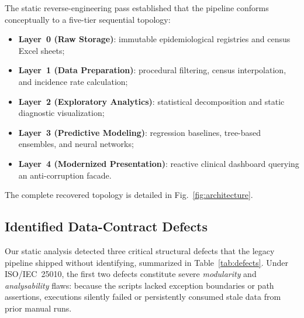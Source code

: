 \documentclass[conference]{IEEEtran}
\begin{document}
The static reverse-engineering pass established that the pipeline conforms conceptually to a five-tier sequential topology:
\begin{itemize}
  \item \textbf{Layer~0 (Raw Storage)}: immutable epidemiological registries and census Excel sheets;
  \item \textbf{Layer~1 (Data Preparation)}: procedural filtering, census interpolation, and incidence rate calculation;
  \item \textbf{Layer~2 (Exploratory Analytics)}: statistical decomposition and static diagnostic visualization;
  \item \textbf{Layer~3 (Predictive Modeling)}: regression baselines, tree-based ensembles, and neural networks;
  \item \textbf{Layer~4 (Modernized Presentation)}: reactive clinical dashboard querying an anti-corruption facade.
\end{itemize}
The complete recovered topology is detailed in Fig.~\ref{fig:architecture}.

\subsection{Identified Data-Contract Defects}
\label{sec:defects}

Our static analysis detected three critical structural defects that the legacy pipeline shipped without identifying, summarized in Table~\ref{tab:defects}. Under ISO/IEC~25010, the first two defects constitute severe \textit{modularity} and \textit{analysability} flaws: because the scripts lacked exception boundaries or path assertions, executions silently failed or persistently consumed stale data from prior manual runs.
\end{document}
